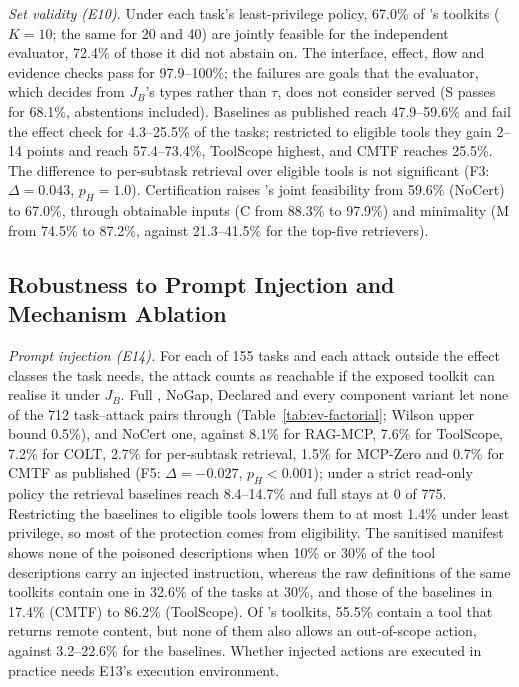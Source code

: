 \emph{Set validity (E10).} Under each task's least-privilege policy, 67.0\% of \pamcp{}'s toolkits ($K=10$; the
same for 20 and 40) are jointly
feasible for the independent evaluator, 72.4\% of those it did not abstain on. The interface, effect, flow and
evidence checks pass for 97.9--100\%; the failures are goals that the evaluator, which decides from $J_B$'s types
rather than $\tau$, does not consider served (S passes for 68.1\%, abstentions included). Baselines as published
reach 47.9--59.6\% and fail the effect check for 4.3--25.5\% of the tasks; restricted to eligible tools they gain
2--14 points and reach 57.4--73.4\%, ToolScope highest, and CMTF reaches 25.5\%. The difference to per-subtask
retrieval over eligible tools is not significant (F3: $\Delta=0.043$, $p_H=1.0$). Certification raises
\pamcp{}'s joint feasibility from 59.6\% (NoCert) to 67.0\%, through obtainable inputs (C from 88.3\% to 97.9\%)
and minimality (M from 74.5\% to 87.2\%, against 21.3--41.5\% for the top-five retrievers).

\subsection{Robustness to Prompt Injection and Mechanism Ablation}
\label{sec:ev-ablation}



\emph{Prompt injection (E14).} For each of 155 tasks and each attack outside the effect classes the task needs, the
attack counts as reachable if the exposed toolkit can realise it under $J_B$. Full \pamcp{}, NoGap, Declared and
every component variant let none of the 712 task--attack pairs through (Table~\ref{tab:ev-factorial}; Wilson upper
bound 0.5\%), and NoCert one, against 8.1\% for RAG-MCP, 7.6\% for ToolScope, 7.2\% for COLT, 2.7\% for
per-subtask retrieval, 1.5\% for MCP-Zero and 0.7\% for CMTF as published (F5: $\Delta=-0.027$, $p_H<0.001$);
under a strict read-only policy the retrieval baselines reach 8.4--14.7\% and full \pamcp{} stays at 0 of 775.
Restricting the baselines to eligible tools lowers them to at most 1.4\% under least privilege, so most of the
protection comes from eligibility. The sanitised manifest shows none of the poisoned descriptions when 10\% or
30\% of the tool descriptions carry an injected instruction, whereas the raw definitions of the same toolkits
contain one in 32.6\% of the tasks at 30\%, and those of the baselines in 17.4\% (CMTF) to 86.2\% (ToolScope). Of
\pamcp{}'s toolkits, 55.5\% contain a tool that returns remote content, but none of them also allows an
out-of-scope action, against 3.2--22.6\% for the baselines. Whether injected actions are executed in practice
needs E13's execution environment.

